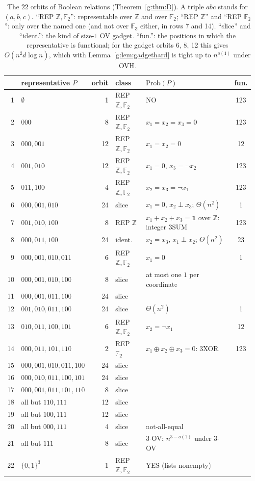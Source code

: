 \documentclass[11pt]{article}
\theoremstyle{definition}
\theoremstyle{remark}
\newcommand{\Z}{\mathbb{Z}}
\newcommand{\F}{\mathbb{F}_2}
\newcommand{\Prob}{\mathrm{Prob}}
\begin{document}
\begin{table}[ht]
\centering\small
\renewcommand{\arraystretch}{1.1}
\begin{tabular}{@{}r>{\raggedright}p{3.6cm}rl>{\raggedright}p{4.6cm}c@{}}
& representative $P$ & orbit & class & $\Prob(P)$ & fun.\\\hline
1&$\emptyset$&1&REP $\Z,\F$&NO&123\\
2&$000$&8&REP $\Z,\F$&$x_1=x_2=x_3=0$&123\\
3&$000,001$&12&REP $\Z,\F$&$x_1=x_2=0$&12\\
4&$001,010$&12&REP $\Z,\F$&$x_1=0$, $x_3=\neg x_2$&123\\
5&$011,100$&4&REP $\Z,\F$&$x_2=x_3=\neg x_1$&123\\
6&$000,001,010$&24&slice&$x_1=0$, $x_2\perp x_3$; $\Theta(n^2)$&1\\
7&$001,010,100$&8&REP $\Z$&$x_1+x_2+x_3=\mathbf 1$ over $\Z$: integer 3SUM&123\\
8&$000,011,100$&24&ident.&$x_2=x_3$, $x_1\perp x_2$; $\Theta(n^2)$&23\\
9&$000,001,010,011$&6&REP $\Z,\F$&$x_1=0$&1\\
10&$000,001,010,100$&8&slice&at most one $1$ per coordinate&\\
11&$000,001,011,100$&24&slice&&\\
12&$001,010,011,100$&24&slice&$\Theta(n^2)$&1\\
13&$010,011,100,101$&6&REP $\Z,\F$&$x_2=\neg x_1$&12\\
14&$000,011,101,110$&2&REP $\F$&$x_1\oplus x_2\oplus x_3=0$: 3XOR&123\\
15&$000,001,010,011,100$&24&slice&&\\
16&$000,010,011,100,101$&24&slice&&\\
17&$000,001,011,101,110$&8&slice&&\\
18&all but $110,111$&12&slice&&\\
19&all but $100,111$&12&slice&&\\
20&all but $000,111$&4&slice&not-all-equal&\\
21&all but $111$&8&slice&3-OV; $n^{3-o(1)}$ under 3-OV&\\
22&$\{0,1\}^3$&1&REP $\Z,\F$&YES (lists nonempty)&
\end{tabular}
\caption{The $22$ orbits of Boolean relations (Theorem~\ref{g:thm:D}). A triple $abc$ stands for $(a,b,c)$. ``REP $\Z,\F$'': representable over $\Z$ and over $\F$; ``REP $\Z$'' and ``REP $\F$'': only over the named one (and not over $\mathbb F_3$ either, in rows 7 and 14). ``slice'' and ``ident.'': the kind of size-$1$ OV gadget. ``fun.'': the positions in which the representative is functional; for the gadget orbits 6, 8, 12 this gives $O(n^2d\log n)$, which with Lemma~\ref{g:lem:gadgethard} is tight up to $n^{o(1)}$ under OVH.}
\label{g:tab:boolean}
\end{table}
\end{document}
